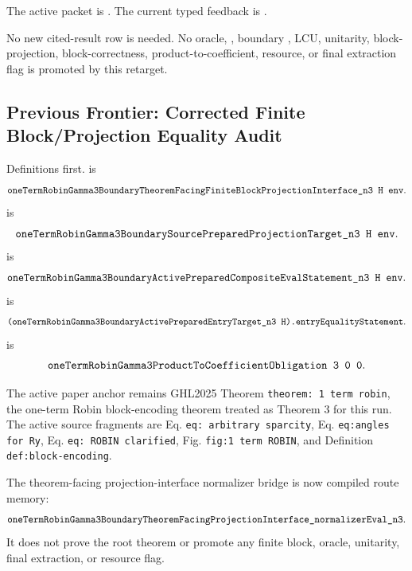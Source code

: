 The active packet is
.
The current typed feedback is
.

No new cited-result row is needed.  No oracle, , boundary
, LCU, unitarity, block-projection, block-correctness,
product-to-coefficient, resource, or final extraction flag is promoted by this
retarget.

\subsection{Previous Frontier: Corrected Finite Block/Projection Equality Audit}

Definitions first.   is
\[
  \Lean{oneTermRobinGamma3BoundaryTheoremFacingFiniteBlockProjectionInterface\_n3\ H\ env}.
\]
 is
\[
  \Lean{oneTermRobinGamma3BoundarySourcePreparedProjectionTarget\_n3\ H\ env}.
\]
 is
\[
  \Lean{oneTermRobinGamma3BoundaryActivePreparedCompositeEvalStatement\_n3\ H\ env}.
\]
 is
\[
  \Lean{(oneTermRobinGamma3BoundaryActivePreparedEntryTarget\_n3\ H).entryEqualityStatement}.
\]
 is
\[
  \Lean{oneTermRobinGamma3ProductToCoefficientObligation\ 3\ 0\ 0}.
\]

The active paper anchor remains GHL2025 Theorem
\texttt{theorem: 1 term robin}, the one-term Robin block-encoding theorem
treated as Theorem 3 for this run.  The active source fragments are Eq.
\texttt{eq: arbitrary sparcity}, Eq. \texttt{eq:angles for Ry}, Eq.
\texttt{eq: ROBIN clarified}, Fig. \texttt{fig:1 term ROBIN}, and Definition
\texttt{def:block-encoding}.

The theorem-facing projection-interface normalizer bridge is now compiled
route memory:
\[
  \texttt{oneTermRobinGamma3BoundaryTheoremFacingProjectionInterface\_normalizerEval\_n3}.
\]
It does not prove the root theorem or promote any finite block, oracle,
unitarity, final extraction, or resource flag.

